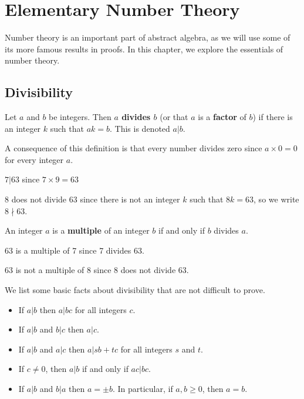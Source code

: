 \chapter{Elementary Number Theory}
Number theory is an important part of abstract algebra, as we will use some of its more famous results in proofs. In this chapter, we explore the essentials of number theory.

\section{Divisibility}
\begin{definition}
    Let $a$ and $b$ be integers. Then \textbf{$a$ divides $b$} (or that $a$ is a \textbf{factor} of $b$) if there is an integer $k$ such that $ak = b$. This is denoted $a\vert b$.
\end{definition}
\begin{remark}
    A consequence of this definition is that every number divides zero since $a \times 0 = 0$ for every integer $a$.
\end{remark}
\begin{example}
    $7\vert 63$ since $7 \times 9 = 63$
\end{example}
\begin{example}
    8 does not divide 63 since there is not an integer $k$ such that $8k = 63$, so we write $8 \nmid 63$.
\end{example}

\begin{definition}
    An integer $a$ is a \textbf{multiple} of an integer $b$ if and only if $b$ divides $a$.
\end{definition}
\begin{example}
    63 is a multiple of 7 since 7 divides 63.
\end{example}
\begin{example}
    63 is not a multiple of 8 since 8 does not divide 63.
\end{example}

We list some basic facts about divisibility that are not difficult to prove.
\begin{itemize}
    \item If $a\vert b$ then $a\vert bc$ for all integers $c$.
    \item If $a\vert b$ and $b\vert c$ then $a\vert c$.
    \item If $a\vert b$ and $a\vert c$ then $a\vert sb+tc$ for all integers $s$ and $t$.
    \item If $c \neq 0$, then $a\vert b$ if and only if $ac\vert bc$.
    \item If $a \vert b$ and $b \vert a$ then $a = \pm b$. In particular, if $a,b\geq 0$, then $a = b$.
\end{itemize}


